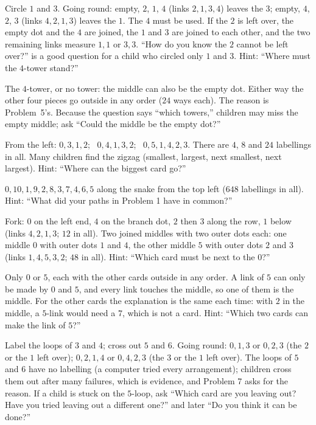 Circle $1$ and $3$. Going round: empty, $2$, $1$, $4$ (links $2,1,3,4$) leaves the $3$; empty, $4$, $2$, $3$ (links $4,2,1,3$) leaves the $1$. The $4$ must be used. If the $2$ is left over, the empty dot and the $4$ are joined, the $1$ and $3$ are joined to each other, and the two remaining links measure $1,1$ or $3,3$. ``How do you know the $2$ cannot be left over?'' is a good question for a child who circled only $1$ and $3$. Hint: ``Where must the $4$-tower stand?''

The $4$-tower, or no tower: the middle can also be the empty dot. Either way the other four pieces go outside in any order ($24$ ways each). The reason is Problem~5's. Because the question says ``which towers,'' children may miss the empty middle; ask ``Could the middle be the empty dot?''

From the left: $0,3,1,2$; \ $0,4,1,3,2$; \ $0,5,1,4,2,3$. There are $4$, $8$ and $24$ labellings in all. Many children find the zigzag (smallest, largest, next smallest, next largest). Hint: ``Where can the biggest card go?''

$0,10,1,9,2,8,3,7,4,6,5$ along the snake from the top left ($648$ labellings in all). Hint: ``What did your paths in Problem 1 have in common?''

Fork: $0$ on the left end, $4$ on the branch dot, $2$ then $3$ along the row, $1$ below (links $4,2,1,3$; $12$ in all). Two joined middles with two outer dots each: one middle $0$ with outer dots $1$ and $4$, the other middle $5$ with outer dots $2$ and $3$ (links $1,4,5,3,2$; $48$ in all). Hint: ``Which card must be next to the $0$?''

Only $0$ or $5$, each with the other cards outside in any order. A link of $5$ can only be made by $0$ and $5$, and every link touches the middle, so one of them is the middle. For the other cards the explanation is the same each time: with $2$ in the middle, a $5$-link would need a $7$, which is not a card. Hint: ``Which two cards can make the link of $5$?''

Label the loops of $3$ and $4$; cross out $5$ and $6$. Going round: $0,1,3$ or $0,2,3$ (the $2$ or the $1$ left over); $0,2,1,4$ or $0,4,2,3$ (the $3$ or the $1$ left over). The loops of $5$ and $6$ have no labelling (a computer tried every arrangement); children cross them out after many failures, which is evidence, and Problem 7 asks for the reason. If a child is stuck on the $5$-loop, ask ``Which card are you leaving out? Have you tried leaving out a different one?'' and later ``Do you think it can be done?''

